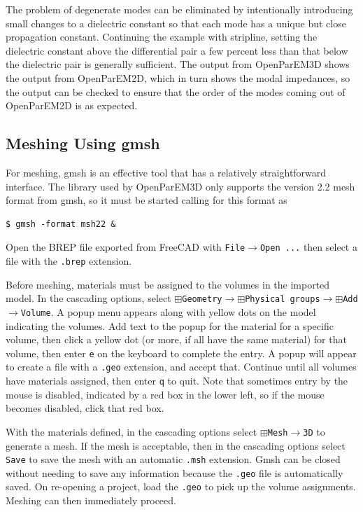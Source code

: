 \documentclass[titlepage]{article}
\renewcommand\_{\textunderscore\linebreak[1]}
\begin{document}
The problem of degenerate modes can be eliminated by intentionally introducing small changes to a dielectric constant so that each mode has a unique but close propagation constant.  Continuing the example with stripline, setting the dielectric constant above the differential pair a few percent less than that below the dielectric pair is generally sufficient.  The output from OpenParEM3D shows the output from OpenParEM2D, which in turn shows the modal impedances, so the output can be checked to ensure that the order of the modes coming out of OpenParEM2D is as expected.

\subsection{Meshing Using gmsh}
\label{sec:gmsh}

For meshing, gmsh is an effective tool that has a relatively straightforward interface.  The library used by OpenParEM3D only supports the version 2.2 mesh format from gmsh, so it must be started calling for this format as
\begin{Verbatim}[fontsize=\small]
   $ gmsh -format msh22 &
\end{Verbatim}
\noindent Open the BREP file exported from FreeCAD with \texttt{File}$\rightarrow$\texttt{Open ...} then select a file with the \texttt{.brep} extension.

Before meshing, materials must be assigned to the volumes in the imported model.  In the cascading options, select $\boxplus$\texttt{Geometry}$\rightarrow$$\boxplus$\texttt{Physical groups}$\rightarrow$$\boxplus$\texttt{Add}$\rightarrow$\texttt{Volume}.  A popup menu appears along with yellow dots on the model indicating the volumes.  Add text to the popup for the material for a specific volume, then click a yellow dot (or more, if all have the same material) for that volume, then enter \texttt{e} on the keyboard to complete the entry.  A popup will appear to create a file with a \texttt{.geo} extension, and accept that.  Continue until all volumes have materials assigned, then enter \texttt{q} to quit.  Note that sometimes entry by the mouse is disabled, indicated by a red box in the lower left, so if the mouse becomes disabled, click that red box.

With the materials defined, in the cascading options select $\boxplus$\texttt{Mesh}$\rightarrow$\texttt{3D} to generate a mesh.  If the mesh is acceptable, then in the cascading options select \texttt{Save} to save the mesh with an automatic \texttt{.msh} extension.  Gmsh can be closed without needing to save any information because the \texttt{.geo} file is automatically saved.
On re-opening a project, load the \texttt{.geo} to pick up the volume assignments.  Meshing can then immediately proceed.
\end{document}
